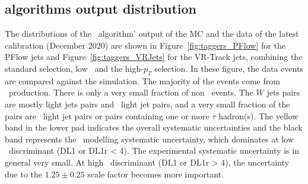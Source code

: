 \subsection{\texorpdfstring{\btagging}{b-tagging} algorithms output distribution}
The distributions of the \btagging\ algorithm' output of 
the MC and the data of the latest calibration 
(December 2020) are shown in Figure~\ref{fig:taggers_PFlow} for the PFlow jets and 
Figure~\ref{fig:taggers_VRJets} for the VR-Track jets, 
combining the standard selection, low \pt\ and the high-$p_T$ selection. 
In these figure, the data events are compared against the simulation.
The majority of the events come from \ttbar\ production. There is only
a very small fraction of non \ttbar\ events. The $W$ jets pairs are mostly light jets 
pairs and \cjet\ light jet pairs, and a very small fraction of the pairs are 
\bjet\ light jet pairs or pairs containing one or more $\tau$ hadron(s). 
The yellow band in the lower pad indicates the overall systematic uncertainties
and the black band represents the \ttbar\ modelling systematic uncertainty, 
which dominates at low \btagging\ discriminant (DL1 or DL1r < 4). 
The experimental systematic uncertainty is in general very small. 
At high \btagging\ discriminant (DL1 or DL1r > 4), the
uncertainty due to the $1.25 \pm 0.25$ scale factor 
becomes more important. 
